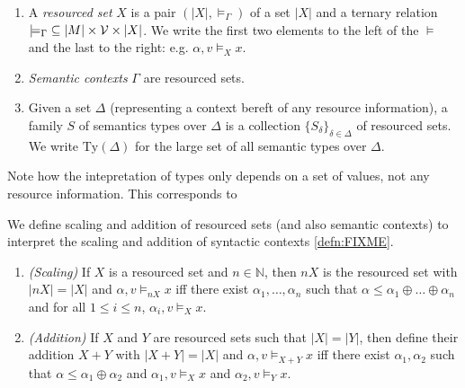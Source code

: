 \documentclass[acmsmall,review]{acmart}
\newcommand{\Ty}{\mathrm{Ty}}
\begin{document}
\begin{definition}
  \label{defn:rl-object}
  \begin{enumerate}
  \item A \emph{resourced set} $X$ is a pair $(|X|,\models_\Gamma)$ of
    a set $|X|$ and a ternary relation
    $\mathord{\models_\Gamma} \subseteq |M| \times \mathcal{V} \times |X|$. We write
    the first two elements to the left of the $\models$ and the last
    to the right: e.g. $\alpha, v \models_X x$.
  \item \emph{Semantic contexts} $\Gamma$ are resourced sets.
  \item Given a set $\Delta$ (representing a context bereft of any
    resource information), a family $S$ of semantics types over
    $\Delta$ is a collection $\{S_\delta\}_{\delta \in \Delta}$ of
    resourced sets. We write $\Ty(\Delta)$ for the large set of all
    semantic types over $\Delta$.
  \end{enumerate}
\end{definition}
Note how the intepretation of types only depends on a set of values,
not any resource information. This corresponds to

We define scaling and addition of resourced sets (and also semantic
contexts) to interpret the scaling and addition of syntactic contexts
\autoref{defn:FIXME}.

\begin{definition}
  \begin{enumerate}
  \item \emph{(Scaling)} If $X$ is a resourced set and
    $n \in \mathbb{N}$, then $nX$ is the resourced set with
    $|nX| = |X|$ and $\alpha, v \models_{nX} x$ iff there exist
    $\alpha_1, \dots, \alpha_n$ such that
    $\alpha \leq \alpha_1 \oplus \dots \oplus \alpha_n$ and for all
    $1 \leq i \leq n$, $\alpha_i, v \models_X x$.
  \item \emph{(Addition)} If $X$ and $Y$ are resourced sets such that
    $|X| = |Y|$, then define their addition $X + Y$ with
    $|X + Y| = |X|$ and $\alpha, v \models_{X + Y} x$ iff there exist
    $\alpha_1, \alpha_2$ such that
    $\alpha \leq \alpha_1 \oplus \alpha_2$ and
    $\alpha_1, v \models_X x$ and $\alpha_2, v \models_Y x$.
  \end{enumerate}
\end{definition}
\end{document}
